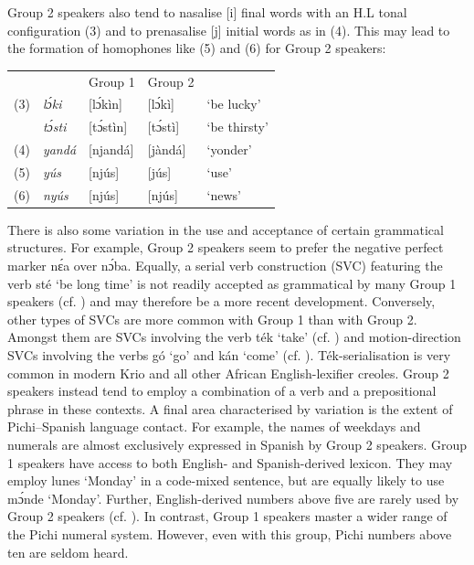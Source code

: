 \bigskip
Group 2 speakers also tend to nasalise [i] final words with an H.L tonal configuration (3) and to prenasalise [j] initial words as in (4). This may lead to the formation of homophones like (5) and (6) for Group 2 speakers:

\bigskip
\noindent\begin{tabularx}{\textwidth}{l ll lX}
 &  & Group 1 & Group 2 & \\
(3)





         & \itshape lɔ́ki & [lɔ́kìn] & [lɔ́kì] & ‘be lucky’\\
& \itshape tɔ́sti & [tɔ́stìn] & [tɔ́stì] & ‘be thirsty’\\
(4)




         & \itshape yandá & [njandá] & [jàndá] & ‘yonder’\\
(5)





         & \itshape yús & [njús] & [jús] & ‘use’\\
(6)





         & \itshape nyús & [njús] & [njús] & ‘news’\\
\end{tabularx}
\addtocounter{equation}{6}

There is also some variation in the use and acceptance of certain grammatical structures. For example, Group 2 speakers seem to prefer the negative perfect marker nɛ́a over nɔ́ba. Equally, a serial verb construction (SVC) featuring the verb sté ‘be long time’ is not readily accepted as grammatical by many Group 1 speakers (cf. ) and may therefore be a more recent development. Conversely, other types of SVCs are more common with Group 1 than with Group 2. Amongst them are SVCs involving the verb ték ‘take’ (cf. ) and motion-direction SVCs involving the verbs gó ‘go’ and kán ‘come’ (cf. ). Ték-serialisation is very common in modern Krio and all other African English-lexifier creoles. Group 2 speakers instead tend to employ a combination of a verb and a prepositional phrase in these contexts. A final area characterised by variation is the extent of Pichi–Spanish language contact. For example, the names of weekdays and numerals are almost exclusively expressed in Spanish by Group 2 speakers. Group 1 speakers have access to both English- and Spanish-derived lexicon. They may employ lunes ‘Monday’ in a code-mixed sentence, but are equally likely to use mɔ́nde ‘Monday’. Further, English-derived numbers above five are rarely used by Group 2 speakers (cf. ). In contrast, Group 1 speakers master a wider range of the Pichi numeral system. However, even with this group, Pichi numbers above ten are seldom heard.

